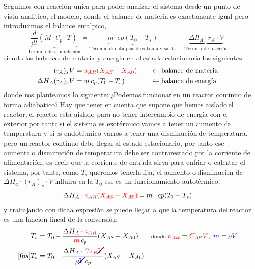 \noindent Seguimos con reacción unica para poder analizar el sistema desde un punto de vista analitico, el modelo, donde el balance de materia es exactamente igual pero introducimos el balance entalpico,
\begin{equation}
	\underbrace{\frac{d}{dt}  (M\cdot C_p \cdot T)}_{\text{Termino de acumulación}} = \underbrace{m \cdot cp (T_0 - T_s)}_{\text{Termino de entalpías de entrada y salida}} + \underbrace{ \Delta H_A \cdot r_A \cdot V}_{\text{Termino de reacción}}
\end{equation}
siendo los balances de materia y energia en el estado estacionario los siguientes:
\begin{align}
	(r_A)_s V            & = \textcolor{red}{n_{AR} (X_{AS}-X_{A0})}
	                     & \quad                                     & \leftarrow \text{balance de materia} \\
	\Delta H_A (r_A)_s V & = m\, c_p (T_0 - T_s)
	                     & \quad                                     & \leftarrow \text{balance de energía}
\end{align}
donde nos planteamos lo siguiente: ¿Podemos funcionar en un reactor continuo de forma adiabatico?
Hay que tener en cuenta que supone que hemos aislado el reactor, el reactor esta aislado para no tener intercambio de energía con el exterior por tanto si el sistema es exotérmico vamos a tener un aumento de temperatura y si es endotérmico vamos a tener una disminución de temperatura, pero un reactor continuo debe llegar al estado estacionario, por tanto
ese aumento o disminución de temperatura debe ser contrarestado por la corriente de alimentación, es decir que la corriente de entrada sirva para enfriar o calentar el sistema, por tanto, como $T_s$ queremos tenerla fija, el aumento o disminucion de $\Delta H_a \cdot (r_A)_s \cdot V$ influira en la $T_0$ eso es un funcionamiento autotérmico.
\begin{equation}
	\Delta H_A\cdot \textcolor{red}{n_{AR} (X_{AS}-X_{A0})} = {m \cdot cp (T_0 - T_s)}
\end{equation}
y trabajando con dicha expresión se puede llegar a que la temperatura del reactor es una funcion lineal de la conversión:
\begin{align}
	T_s & = T_0 + \frac{\Delta H_A \cdot \textcolor{red}{n_{AR}}}{\textcolor{red}{m}\, c_p} (X_{AS}-X_{A0})
	    &                                                                                                                                                              & \text{\scriptsize donde }
	\textcolor{red}{n_{AR}} = \textcolor{red}{C_{AR} V},\;
	\textcolor{blue}{m} = \textcolor{blue}{\rho V}                                                                                                                                                 \\
	[6pt]
	T_s & = T_0 + \frac{\Delta H_A \cdot \textcolor{red}{C_{AR}}\cancel{\textcolor{red}{V}}}{\textcolor{blue}{\rho}\cancel{\textcolor{blue}{V}}\, c_p} (X_{AS}-X_{A0})
\end{align}
